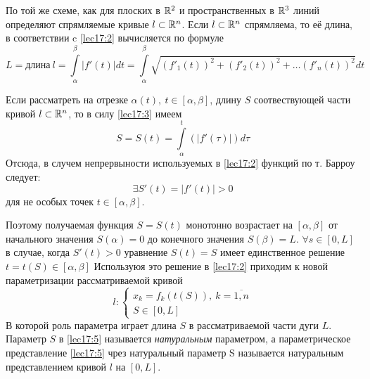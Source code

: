 \documentclass[../../main.tex]{subfiles}
\begin{document}
По той же схеме, как для плоских в $\mathbb{R}^2$ и пространственных в  $\mathbb{R}^3$ 
линий определяют спрямляемые кривые $l \subset \mathbb{R}^n$.
Если $l \subset \mathbb{R}^n$ спрямляема, то её длина, 
в соответствии c \eqref{lec17:2}
вычисляется по формуле
\begin{equation}
 \label{lec17:3}
 L = \text{длина}\ l = \int\limits_\alpha^\beta|f'(t)|dt =  
 \int\limits_\alpha^\beta\sqrt{(f'_1(t))^2 + (f'_2(t))^2 
 + \dots (f'_n(t))^2}dt
\end{equation}

Если рассматреть на отрезке $\alpha(t),\ t \in \left[\alpha, \beta\right]$,
длину $S$ соотвествующей части кривой $l \subset \mathbb{R}^n$, 
то в силу \eqref{lec17:3} имеем
\begin{equation}
\label{lec17:4}
 S = S(t) = \int\limits_\alpha^t(|f'(\tau)|)d\tau
\end{equation}
Отсюда, в случем непрервыности используемых в \eqref{lec17:2} 
функций  по т. Барроу следует:
\[
  \exists S'(t) = |f'(t)|>0
\]
для не особых точек $t \in \left[\alpha, \beta \right]$.

Поэтому получаемая функция $S = S(t)$ монотонно возрастает 
на $\left[\alpha, \beta \right]$ от начального значения  $S(\alpha) = 0$ 
до конечного значения $S(\beta) = L$.
$\forall s \in \left[0, L \right]$ в случае, когда $S'(t) > 0$  уравнение
$S(t) = S$ имеет единственное решение 
$t = t(S) \in \left[\alpha, \beta \right]$
Используюя это решение в \eqref{lec17:2} приходим к новой параметризации
рассматриваемой кривой
\begin{equation}
 \label{lec17:5}
 l:
 \left\{
   \begin{array}{cc}
      x_k = f_k(t(S)),\ k = \overline{1,n}\\
      S \in \left[0, L \right]
   \end{array}
 \right.
\end{equation}
В которой роль параметра играет длина $S$ в рассматриваемой части дуги $L$.
Параметр $S$ в \eqref{lec17:5} называется \emph{натуральным} параметром, 
а параметрическое представление \eqref{lec17:5} чрез натуральный параметр S
называется натуральным представлением кривой $l$ на $\left[ 0, L \right]$.
\end{document}
